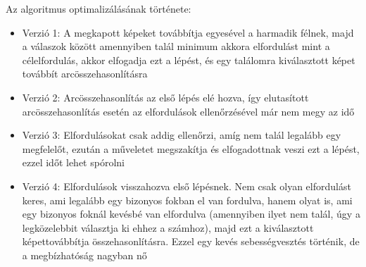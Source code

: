 Az algoritmus optimalizálásának története:
\begin{itemize}
\item Verzió 1: A megkapott képeket továbbítja egyesével a harmadik félnek, majd a válaszok között amennyiben talál minimum akkora elfordulást mint a célelfordulás, akkor elfogadja ezt a lépést, és egy találomra kiválasztott képet továbbít arcösszehasonlításra
\item Verzió 2: Arcösszehasonlítás az első lépés elé hozva, így elutasított arcösszehasonlítás esetén az elfordulások ellenőrzésével már nem megy az idő
\item Verzió 3: Elfordulásokat csak addig ellenőrzi, amíg nem talál legalább egy megfelelőt, ezután a műveletet megszakítja és elfogadottnak veszi ezt a lépést, ezzel időt lehet spórolni
\item Verzió 4: Elfordulások visszahozva első lépésnek. Nem csak olyan elfordulást keres, ami legalább egy bizonyos fokban el van fordulva, hanem olyat is, ami egy bizonyos foknál kevésbé van elfordulva (amennyiben ilyet nem talál, úgy a legközelebbit választja ki ehhez a számhoz), majd ezt a kiválasztott képettovábbítja összehasonlításra. Ezzel egy kevés sebességvesztés történik, de a megbízhatóság nagyban nő
\end{itemize}


